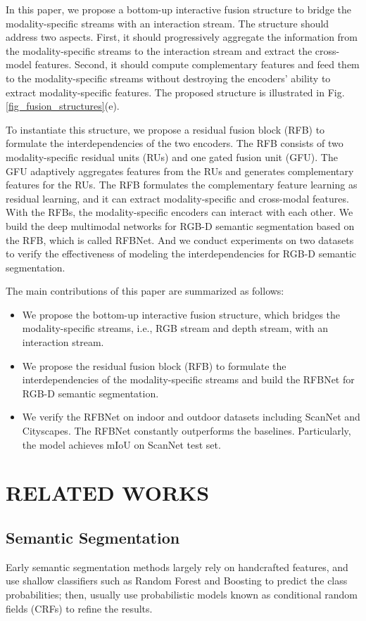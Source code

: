 \documentclass[letterpaper, 10 pt, conference]{ieeeconf}
\begin{document}
	In this paper, we propose a bottom-up interactive fusion structure to bridge the modality-specific streams with an interaction stream. The structure should address two aspects. First, it should progressively aggregate the information from the modality-specific streams to the interaction stream and extract the cross-model features. Second, it should compute complementary features and feed them to the modality-specific streams without destroying the encoders' ability to extract modality-specific features. The proposed structure is illustrated in Fig.\ref{fig_fusion_structures}(e).
	
	To instantiate this structure, we propose a residual fusion block (RFB) to formulate the interdependencies of the two encoders. The RFB consists of two modality-specific residual units (RUs) and one gated fusion unit (GFU). The GFU adaptively aggregates features from the RUs and generates complementary features for the RUs. The RFB formulates the complementary feature learning as residual learning, and it can extract modality-specific and cross-modal features. With the RFBs, the modality-specific encoders can interact with each other. We build the deep multimodal networks for RGB-D semantic segmentation based on the RFB, which is called RFBNet. And we conduct experiments on two datasets to verify the effectiveness of modeling the interdependencies for RGB-D semantic segmentation.
	
	The main contributions of this paper are summarized as follows:
	\begin{itemize}
		\item We propose the bottom-up interactive fusion structure, which bridges the modality-specific streams, i.e., RGB stream and depth stream, with an interaction stream.
		\item We propose the residual fusion block (RFB) to formulate the interdependencies of the modality-specific streams and build the RFBNet for RGB-D semantic segmentation.
		\item We verify the RFBNet on indoor and outdoor datasets including ScanNet\cite{dai2017scannet} and Cityscapes\cite{cordts2016cityscapes}. The RFBNet constantly outperforms the baselines. Particularly, the model achieves  mIoU on ScanNet test set.
	\end{itemize}
	
	\section{RELATED WORKS}
	\subsection{Semantic Segmentation}
	Early semantic segmentation methods largely rely on handcrafted features, and use shallow classifiers such as Random Forest and Boosting to predict the class probabilities; then, usually use probabilistic models known as conditional random fields (CRFs) to refine the results\cite{muller2014learning,shotton2009textonboost}. 
	
\end{document}
